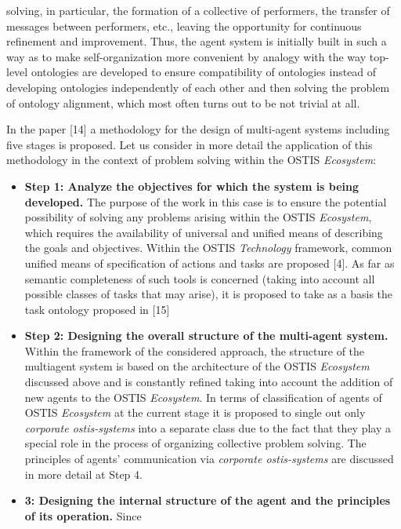 \documentclass[12pt, a4paper]{article}
\begin{document}
\begin{multicols}{2}
solving, in particular, the formation of a collective of
performers, the transfer of messages between performers,
etc., leaving the opportunity for continuous refinement
and improvement. Thus, the agent system is initially built
in such a way as to make self-organization more convenient by analogy with the way top-level ontologies are
developed to ensure compatibility of ontologies instead
of developing ontologies independently of each other and
then solving the problem of ontology alignment, which
most often turns out to be not trivial at all.\par
In the paper [14] a methodology for the design of
multi-agent systems including five stages is proposed.
Let us consider in more detail the application of this
methodology in the context of problem solving within
the OSTIS \textit {Ecosystem}:
\begin{itemize}
\setlength{\itemsep}{0pt}
  \setlength{\parskip}{1pt}
  \setlength{\parsep}{0pt}
    \item \textbf {Step 1: Analyze the objectives for which the
system is being developed.} The purpose of the
work in this case is to ensure the potential possibility of solving any problems arising within the
OSTIS \textit {Ecosystem}, which requires the availability
of universal and unified means of describing the
goals and objectives. Within the OSTIS \textit {Technology}
framework, common unified means of specification
of actions and tasks are proposed [4]. As far as
semantic completeness of such tools is concerned
(taking into account all possible classes of tasks that
may arise), it is proposed to take as a basis the task
ontology proposed in [15]
\item  \textbf {Step 2: Designing the overall structure of the
multi-agent system.} Within the framework of the
considered approach, the structure of the multiagent system is based on the architecture of the
OSTIS \textit {Ecosystem} discussed above and is constantly
refined taking into account the addition of new
agents to the OSTIS \textit {Ecosystem}. In terms of classification of agents of OSTIS \textit {Ecosystem} at the current
stage it is proposed to single out only \textit {corporate
ostis-systems} into a separate class due to the fact
that they play a special role in the process of organizing collective problem solving. The principles of
agents’ communication via \textit {corporate ostis-systems}
are discussed in more detail at Step 4.
\item \textbf{3: Designing the internal structure of the
agent and the principles of its operation.} Since

\end{itemize}
\end{multicols}
\end{document}
